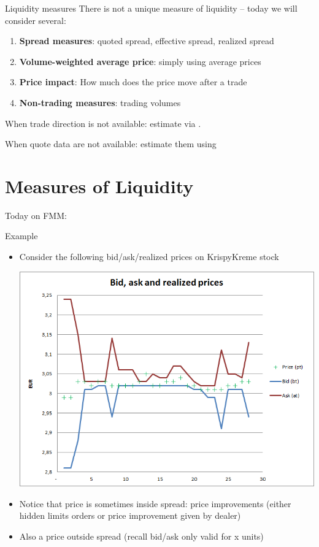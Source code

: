 \documentclass[english,10pt]{beamer}
\begin{document}
\begin{frame}{Liquidity measures}
	There is not a unique measure of liquidity -- today we will consider several:
	\begin{enumerate}
		\item \textbf{Spread measures}: quoted spread, effective spread, realized spread
		\item \textbf{Volume-weighted average price}: simply using average prices
		\item \textbf{Price impact}: How much does the price move after a trade
		\item \textbf{Non-trading measures}: trading volumes
	\end{enumerate}

	When trade direction is not available: estimate via . 
	
	When quote data are not available: estimate them using 
\end{frame}



\section{Measures of Liquidity}

\begin{frame}{Today on FMM:}
	\tableofcontents[currentsection]
\end{frame}


\begin{frame}{Example}
	\begin{itemize}
		\item Consider the following bid/ask/realized prices on KrispyKreme stock
		\begin{center}
			\includegraphics[scale=0.34]{pics/L2_bidask}
		\end{center}
		\item Notice that price is sometimes inside spread: price improvements (either hidden limits orders or price improvement given by dealer)
		\item Also a price outside spread (recall bid/ask only valid for x units)
	\end{itemize}
\end{frame}
\end{document}
